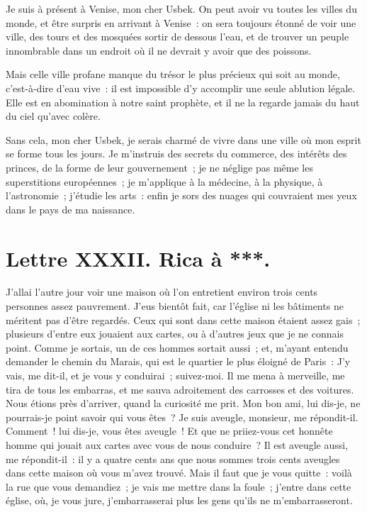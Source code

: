 \documentclass[french,twoside]{book} %
\newcommand{\dateline}[1]{\medskip{\RaggedLeft{#1}\par}\bigskip}
\begin{document}
\noindent Je suis à présent à Venise, mon cher Usbek. On peut avoir vu toutes les villes du monde, et être surpris en arrivant à Venise : on sera toujours étonné de voir une ville, des tours et des mosquées sortir de dessous l’eau, et de trouver un peuple innombrable dans un endroit où il ne devrait y avoir que des poissons.\par
Mais celle ville profane manque du trésor le plus précieux qui soit au monde, c’est-à-dire d’eau vive : il est impossible d’y accomplir une seule ablution légale. Elle est en abomination à notre saint prophète, et il ne la regarde jamais du haut du ciel qu’avec colère.\par
Sans cela, mon cher Usbek, je serais charmé de vivre dans une ville où mon esprit se forme tous les jours. Je m’instruis des secrets du commerce, des intérêts des princes, de la forme de leur gouvernement ; je ne néglige pas même les superstitions européennes ; je m’applique à la médecine, à la physique, à l’astronomie ; j’étudie les arts : enfin je sors des nuages qui couvraient mes yeux dans le pays de ma naissance.\par

\dateline{À Venise, le 16 de la lune de Chalval, 1712}
\section[{Lettre XXXII. Rica à ***.}]{Lettre XXXII. Rica à ***.}\renewcommand{\leftmark}{Lettre XXXII. Rica à ***.}

\noindent J’allai l’autre jour voir une maison où l’on entretient environ trois cents personnes assez pauvrement. J’eus bientôt fait, car l’église ni les bâtiments ne méritent pas d’être regardés. Ceux qui sont dans cette maison étaient assez gais ; plusieurs d’entre eux jouaient aux cartes, ou à d’autres jeux que je ne connais point. Comme je sortais, un de ces hommes sortait aussi ; et, m’ayant entendu demander le chemin du Marais, qui est le quartier le plus éloigné de Paris : J’y vais, me dit-il, et je vous y conduirai ; suivez-moi. Il me mena à merveille, me tira de tous les embarras, et me sauva adroitement des carrosses et des voitures. Nous étions près d’arriver, quand la curiosité me prit. Mon bon ami, lui dis-je, ne pourrais-je point savoir qui vous êtes ? Je suis aveugle, monsieur, me répondit-il. Comment ! lui dis-je, vous êtes aveugle ! Et que ne priiez-vous cet honnête homme qui jouait aux cartes avec vous de nous conduire ? Il est aveugle aussi, me répondit-il : il y a quatre cents ans que nous sommes trois cents aveugles dans cette maison où vous m’avez trouvé. Mais il faut que je vous quitte : voilà la rue que vous demandiez ; je vais me mettre dans la foule ; j’entre dans cette église, où, je vous jure, j’embarrasserai plus les gens qu’ils ne m’embarrasseront.\par
\end{document}
